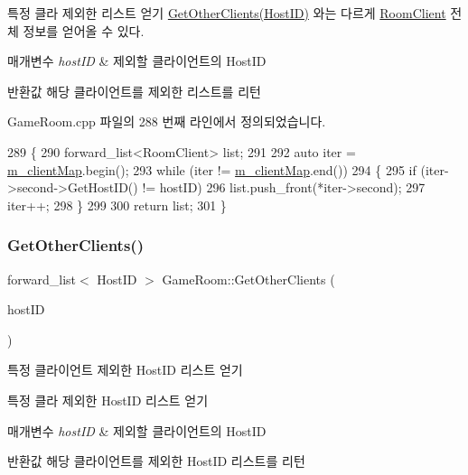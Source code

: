 특정 클라 제외한 리스트 얻기  \hyperlink{class_game_room_a0aa2b2cb945ade2e34de76684a8d7724}{Get\+Other\+Clients(\+Host\+I\+D)} 와는 다르게 \hyperlink{class_room_client}{Room\+Client} 전체 정보를 얻어올 수 있다.


\begin{DoxyParams}{매개변수}
{\em host\+ID} & 제외할 클라이언트의 Host\+ID \\
\hline
\end{DoxyParams}
\begin{DoxyReturn}{반환값}
해당 클라이언트를 제외한 리스트를 리턴 
\end{DoxyReturn}


Game\+Room.\+cpp 파일의 288 번째 라인에서 정의되었습니다.


\begin{DoxyCode}
289 \{
290     forward\_list<RoomClient> list;
291 
292     \textcolor{keyword}{auto} iter = \hyperlink{class_game_room_afc202a511605453216f7dd870ff96c5c}{m\_clientMap}.begin();
293     \textcolor{keywordflow}{while} (iter != \hyperlink{class_game_room_afc202a511605453216f7dd870ff96c5c}{m\_clientMap}.end())
294     \{
295         \textcolor{keywordflow}{if} (iter->second->GetHostID() != hostID)
296             list.push\_front(*iter->second);
297         iter++;
298     \}
299 
300     \textcolor{keywordflow}{return} list;
301 \}
\end{DoxyCode}
\mbox{\label{class_game_room_a0aa2b2cb945ade2e34de76684a8d7724}} 
\subsubsection{\texorpdfstring{Get\+Other\+Clients()}{GetOtherClients()}}
{\footnotesize\ttfamily forward\+\_\+list$<$ Host\+ID $>$ Game\+Room\+::\+Get\+Other\+Clients (\begin{DoxyParamCaption}\item[{Host\+ID}]{host\+ID }\end{DoxyParamCaption})}



특정 클라이언트 제외한 Host\+ID 리스트 얻기 

특정 클라 제외한 Host\+ID 리스트 얻기


\begin{DoxyParams}{매개변수}
{\em host\+ID} & 제외할 클라이언트의 Host\+ID \\
\hline
\end{DoxyParams}
\begin{DoxyReturn}{반환값}
해당 클라이언트를 제외한 Host\+ID 리스트를 리턴 
\end{DoxyReturn}


